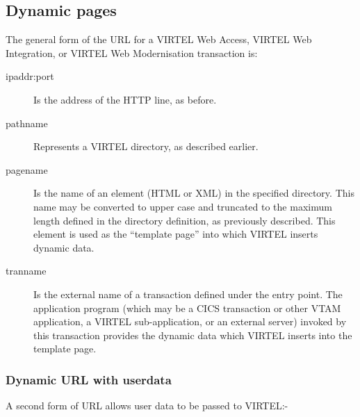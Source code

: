 \documentclass[letterpaper,10pt,english]{sphinxmanual}
\begin{document}
 


\subsection{Dynamic pages}
\label{\detokenize{User_Guide:dynamic-pages}}\label{\detokenize{User_Guide:index-3}}
The general form of the URL for a VIRTEL Web Access, VIRTEL Web Integration, or VIRTEL Web Modernisation transaction is:

\begin{sphinxVerbatim}[commandchars=\\\{\}]
\end{sphinxVerbatim}
\begin{description}
\item[{ipaddr:port}] \leavevmode
Is the address of the HTTP line, as before.

\item[{pathname}] \leavevmode
Represents a VIRTEL directory, as described earlier.

\item[{pagename}] \leavevmode
Is the name of an element (HTML or XML) in the specified directory.
This name may be converted to upper case and truncated to the
maximum length defined in the directory definition, as previously
described. This element is used as the “template page” into which
VIRTEL inserts dynamic data.

\item[{tranname}] \leavevmode
Is the external name of a transaction defined under the entry point.
The application program (which may be a CICS transaction or other
VTAM application, a VIRTEL sub-application, or an external server)
invoked by this transaction provides the dynamic data which VIRTEL
inserts into the template page.

\end{description}


\subsubsection{Dynamic URL with userdata}
\label{\detokenize{User_Guide:v457ug-dynamic-url}}\label{\detokenize{User_Guide:dynamic-url-with-userdata}}
A second form of URL allows user data to be passed to VIRTEL:-
\end{document}
